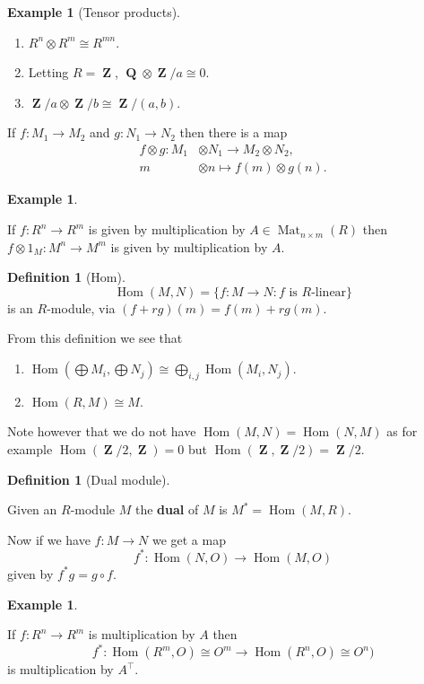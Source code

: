 \documentclass[10pt,]{book}
\newcommand{\terminology}[1]{\textbf{#1}}
\theoremstyle{plain}
\theoremstyle{definition}
\newtheorem{definition}[theorem]{Definition}
\newtheorem{example}[theorem]{Example}
\numberwithin{equation}{section}
\DeclareMathOperator{\Hom}{Hom}
\DeclareMathOperator{\QQ}{\mathbf{Q}}
\DeclareMathOperator{\ZZ}{\mathbf{Z}}
\begin{document}
\begin{example}[Tensor products]\label{example-21}
\begin{enumerate}
\item{}\(R^n \otimes R^m \cong R^{mn}\).\item{}Letting \(R = \ZZ\), \( \QQ \otimes \ZZ/a\cong 0\).\item{}\(\ZZ/a\otimes\ZZ/b\cong \ZZ/(a,b)\).\end{enumerate}
\end{example}
\par
If \(f\colon M_1 \to M_2\) and \(g\colon N_1 \to N_2\) then there is a map
            \begin{align*}
f\otimes g \colon M_1 &\otimes N_1 \to M_2 \otimes N_2,\\
m&\otimes n \mapsto f(m) \otimes g(n).
\end{align*}
\begin{example}\label{example-22}

              If \( f\colon R^n \to R^m\) is given by multiplication by \(A\in \operatorname{Mat}_{n\times m}(R)\) then \(f\otimes 1_M\colon M^n \to M^m\) is given by multiplication by \(A\).
            \end{example}
\begin{definition}[Hom]\label{definition-22}
\[\Hom(M, N) = \{f\colon M\to N : f \text{ is } R \text{-linear}\}\]
              is an \(R\)-module, via \((f + rg)(m) = f(m) + rg(m)\).
            \end{definition}
\par
From this definition we see that
            \begin{enumerate}
\item{}\(\Hom(\bigoplus M_i, \bigoplus N_j)\cong \bigoplus_{i,j} \Hom(M_i, N_j)\).\item{}\(\Hom(R, M) \cong M\).\end{enumerate}

\par
Note however that we do not have \(\Hom(M,N) = \Hom(N,M)\) as for example \(\Hom(\ZZ/2,\ZZ) = 0\) but \(\Hom(\ZZ, \ZZ/2) = \ZZ/2\).%
\begin{definition}[Dual module]\label{definition-23}

              Given an \(R\)-module \(M\) the \terminology{dual} of \(M\) is \(M^* = \Hom(M,R)\).
            \end{definition}
\par
Now if we have \(f\colon M \to N\) we get a map
            \[f^*\colon \Hom(N, O) \to \Hom(M, O)\]
            given by \(f^*g = g\circ f\).
\begin{example}\label{example-23}

              If \(f\colon R^n \to R^m\) is multiplication by \(A\) then
              \[f^*\colon \Hom(R^m , O) \cong O^m \to \Hom(R^n, O) \cong O^n)\]
              is multiplication by \(A^\top\).
            \end{example}
\typeout{************************************************}
\typeout{************************************************}
\end{document}

